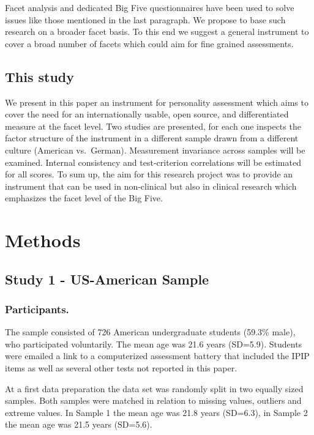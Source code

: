 \documentclass[man]{apa6}
\theoremstyle{definition}
\theoremstyle{definition}
\theoremstyle{definition}
\theoremstyle{remark}
\begin{document}
Facet analysis and dedicated Big Five questionnaires have been used to
solve issues like those mentioned in the last paragraph. We propose to
base such research on a broader facet basis. To this end we suggest a
general instrument to cover a broad number of facets which could aim for
fine grained assessments.

\hypertarget{this-study}{%
\subsection{This study}\label{this-study}}

We present in this paper an instrument for personality assessment which
aims to cover the need for an internationally usable, open source, and
differentiated measure at the facet level. Two studies are presented,
for each one inspects the factor structure of the instrument in a
different sample drawn from a different culture (American vs.~German).
Measurement invariance across samples will be examined. Internal
consistency and test-criterion correlations will be estimated for all
scores. To sum up, the aim for this research project was to provide an
instrument that can be used in non-clinical but also in clinical
research which emphasizes the facet level of the Big Five.

\hypertarget{methods}{%
\section{Methods}\label{methods}}

\hypertarget{study-1---us-american-sample}{%
\subsection{Study 1 - US-American
Sample}\label{study-1---us-american-sample}}

\hypertarget{participants.}{%
\subsubsection{Participants.}\label{participants.}}

The sample consisted of 726 American undergraduate students (59.3\%
male), who participated voluntarily. The mean age was 21.6 years
(SD=5.9). Students were emailed a link to a computerized assessment
battery that included the IPIP items as well as several other tests not
reported in this paper.

At a first data preparation the data set was randomly split in two
equally sized samples. Both samples were matched in relation to missing
values, outliers and extreme values. In Sample 1 the mean age was 21.8
years (SD=6.3), in Sample 2 the mean age was 21.5 years (SD=5.6).
\end{document}
